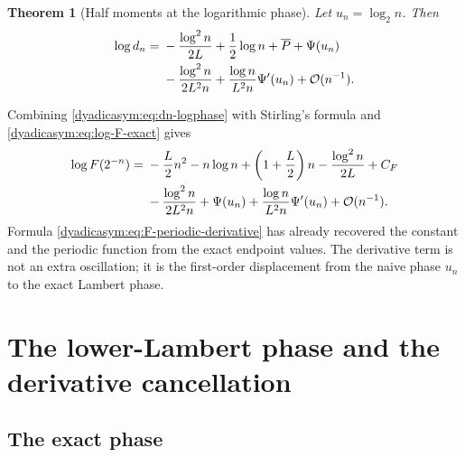 \documentclass[11pt,oneside]{article}
\newtheorem{theorem}{Theorem}[section]
\theoremstyle{definition}
\theoremstyle{remark}
\newcommand{\bigO}{\mathcal O}
\begin{document}
\begin{theorem}[Half moments at the logarithmic phase]
\label{dyadicasym:thm:dn-logphase}
Let $u_n=\log_2n$.  Then
\begin{align}
 \log d_n={}&-\frac{\log^2n}{2L}+\frac12\log n
 +\overline P+\Psi(u_n)                                    \notag\\
 &-\frac{\log^2n}{2L^2n}
 +\frac{\log n}{L^2n}\Psi'(u_n)+\bigO(n^{-1}).             \label{dyadicasym:eq:dn-logphase}
\end{align}
\end{theorem}

Combining \eqref{dyadicasym:eq:dn-logphase} with Stirling's formula and
\eqref{dyadicasym:eq:log-F-exact} gives
\begin{align}
 \log F(2^{-n})={}&-\frac L2n^2-n\log n+
 \left(1+\frac L2\right)n-\frac{\log^2n}{2L}+C_F           \notag\\
 &-\frac{\log^2n}{2L^2n}+\Psi(u_n)
 +\frac{\log n}{L^2n}\Psi'(u_n)+\bigO(n^{-1}).             \label{dyadicasym:eq:F-periodic-derivative}
\end{align}
Formula \eqref{dyadicasym:eq:F-periodic-derivative} has already recovered the constant and the periodic
function from the exact endpoint values.  The derivative term is not an extra oscillation; it
is the first-order displacement from the naive phase $u_n$ to the exact Lambert phase.

\section{The lower-Lambert phase and the derivative cancellation}
\label{dyadicasym:sec:lambert-phase}

\subsection{The exact phase}
\end{document}
